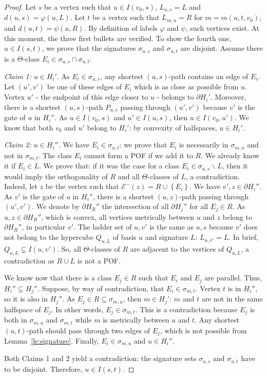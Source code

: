 \documentclass[a4paper,UKenglish,numberwithinsect,cleveref, autoref]{lipics-v2021}
\newcommand{\set}[1]{\left\{ #1 \right\}}
\begin{document}
\begin{proof}
Let $s$ be a vertex such that $u \in I(v_0,s)$, $L_{u,s} = L$ and $d(u,s) = \varphi(u,L)$. Let $t$ be a vertex such that $\overline{L}_{m,u} = R$ for $m = m(u,t,v_0)$, and $d(u,t) = \psi(u,R)$.
By definition of labels $\varphi$ and $\psi$, such vertices exist.
At this moment, the three first bullets are verified.
To show the fourth one, $u \in I(s,t)$, we prove that the signatures $\sigma_{u,s}$ and $\sigma_{u,t}$ are disjoint. Assume there is a $\Theta$-class $E_i \in \sigma_{u,s} \cap \sigma_{u,t}$.

\textit{Claim 1:} $u \in H_i'$.
As $E_i \in \sigma_{u,s}$, any shortest $(u,s)$-path contains an edge of $E_i$. Let $(u',v')$ be one of these edges of $E_i$ which is as close as possible from $u$. Vertex $u'$ - the endpoint of this edge closer to $u$ - belongs to $\partial H_i'$. Moreover, there is a shortest $(u,s)$-path $P_{u,s}$ passing through $(u',v')$ because $v'$ is the gate of $u$ in $H_i''$. As $u \in I(v_0,s)$ and $u' \in I(u,s)$, then $u \in I(v_0,u')$. We know that both $v_0$ and $u'$ belong to $H_i'$: by convexity of halfspaces, $u \in H_i'$. 

\textit{Claim 2:} $u \in H_i''$. We have $E_i \in \sigma_{u,t}$: we prove that $E_i$ is necessarily in $\sigma_{m,u}$ and not in $\sigma_{m,t}$. The class $E_i$ cannot form a POF if we add it to $R$. We already know it if $E_i \in L$. We prove that: if it was the case for a class $E_i \in \sigma_{u,s} \backslash L$, then it would imply the orthogonality of $R$ and all $\Theta$-classes of $L$, a contradiction. Indeed, let $z$ be the vertex such that $\mathcal{E}^-(z) = R \cup \set{E_i}$. We have $v',z \in \partial H_i''$. As $v'$ is the gate of $u$ in $H_i''$, there is a shortest $(u,z)$-path passing through $(u',v')$. We denote by $\partial H_R''$ the intersection of all $\partial H_j''$ for all $E_j \in R$. As $u,z \in \partial H_R''$, which is convex, all vertices metrically between $u$ and $z$ belong to $\partial H_R''$, in particular $v'$. The ladder set of $u,v'$ is the same as $u,s$ because $v'$ does not belong to the hypercube $Q_{u,L}$ of basis $u$ and signature $L$: $L_{u,v'} = L$. In brief, $Q_{u,L} \subsetneq I(u,v')$. So, all $\Theta$-classes of $R$ are adjacent to the vertices of $Q_{u,L}$, a contradiction as $R \cup L$ is not a POF.
 
We know now that there is a class $E_j \in R$ such that $E_i$ and $E_j$ are parallel. Thus, $H_i'' \subsetneq H_j''$. Suppose, by way of contradiction, that $E_i \in \sigma_{m,t}$. Vertex $t$ is in $H_i''$, so it is also in $H_j''$. As $E_j \in R \subseteq \sigma_{m,u}$, then $m \in H_j'$: $m$ and $t$ are not in the same halfspace of $E_j$. In other words, $E_j \in \sigma_{m,t}$. This is a contradiction because $E_j$ is both in $\sigma_{m,u}$ and $\sigma_{m,t}$ while $m$ is metrically between $u$ and $t$. Any shortest $(u,t)$-path should pass through two edges of $E_j$, which is not possible from Lemma~\ref{le:signature}. Finally, $E_i \in \sigma_{m,u}$ and $u \in H_i''$.

Both Claims 1 and 2 yield a contradiction: the signature sets $\sigma_{u,s}$ and $\sigma_{u,t}$ have to be disjoint. Therefore, $u \in I(s,t)$.
\end{proof}
\end{document}
